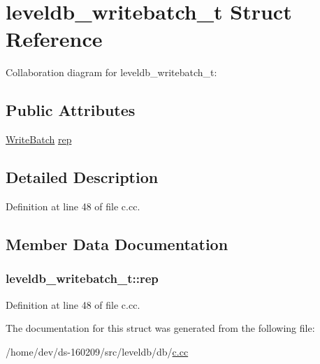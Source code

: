 \hypertarget{structleveldb__writebatch__t}{}\section{leveldb\+\_\+writebatch\+\_\+t Struct Reference}
\label{structleveldb__writebatch__t}


Collaboration diagram for leveldb\+\_\+writebatch\+\_\+t\+:
\subsection*{Public Attributes}
\begin{DoxyCompactItemize}
\item 
\hyperlink{classleveldb_1_1_write_batch}{Write\+Batch} \hyperlink{structleveldb__writebatch__t_ac96538c849db578bea786bf29fae6e5f}{rep}
\end{DoxyCompactItemize}


\subsection{Detailed Description}


Definition at line 48 of file c.\+cc.



\subsection{Member Data Documentation}
\hypertarget{structleveldb__writebatch__t_ac96538c849db578bea786bf29fae6e5f}{}
\subsubsection[{rep}]{ leveldb\+\_\+writebatch\+\_\+t\+::rep}\label{structleveldb__writebatch__t_ac96538c849db578bea786bf29fae6e5f}


Definition at line 48 of file c.\+cc.



The documentation for this struct was generated from the following file\+:\begin{DoxyCompactItemize}
\item 
/home/dev/ds-\/160209/src/leveldb/db/\hyperlink{c_8cc}{c.\+cc}\end{DoxyCompactItemize}
